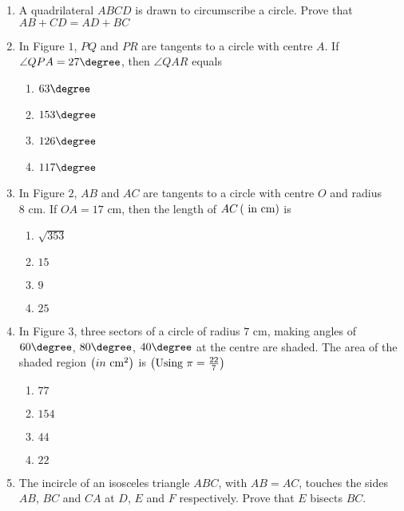 \begin{enumerate}
\item A quadrilateral $ABCD$ is drawn to circumscribe a circle. Prove that\\
$AB + CD = AD + BC$\\
\item In Figure $1$, $PQ$ and $PR$ are tangents to a circle with centre $A$. If $\angle QPA = 27\degree$, then $\angle QAR$ equals\\
\begin{enumerate}
\item $63\degree$\\
\item $153\degree$\\
\item $126\degree$\\
\item $117\degree$\\
\end{enumerate}
\item In Figure $2$, $AB$ and $AC$ are tangents to a circle with centre $O$ and radius $8\text{ cm}$. If $OA = 17\text{ cm}$, then the length of $AC \left(\text { in cm}\right)$  is\\
\begin{enumerate}
\item $\sqrt {353}$\\
\item $15$\\
\item $9$\\
\item $25$\\
\end{enumerate}
\item In Figure $3$, three sectors of a circle of radius $7\text{ cm}$, making angles of $60\degree$, $80\degree$, $40\degree$ at the centre are shaded. The area of the shaded region $\left(in\text{ cm}^2\right)$ is $\left(\text{Using } \pi = \frac{22}{7}\right)$\\
\begin{enumerate}
\item $77$\\
\item $154$\\
\item $44$\\
\item $22$\\
\end{enumerate}
\item The incircle of an isosceles triangle $ABC$, with $AB = AC$, touches the sides $AB$, $BC$ and $CA$ at $D$, $E$ and $F$ respectively. Prove that $E$ bisects $BC$.\\


\end{enumerate}
